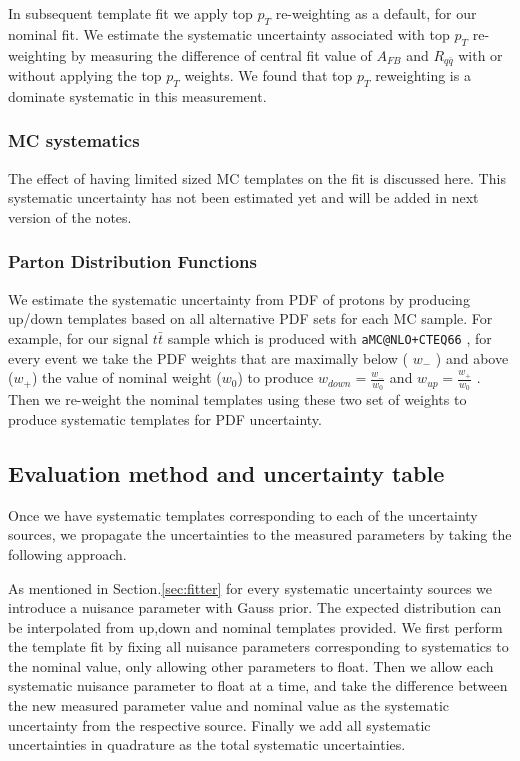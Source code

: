 \documentclass{cmspaperpdf}
\begin{document}
In subsequent template fit we apply top $p_T$ re-weighting as a default, for our nominal fit. We estimate the systematic uncertainty associated with top $p_T$ re-weighting by measuring the difference of central fit value of $A_{FB}$ and $R_{q\bar{q}}$ with or without applying the top $p_T$ weights. We found that top $p_T$ reweighting is a dominate systematic in this measurement. 

\subsubsection{MC systematics}

The effect of having limited sized MC templates on the fit is discussed here. This systematic uncertainty has not been estimated yet and will be added in next version of the notes.

\subsubsection{Parton Distribution Functions}

We estimate the systematic uncertainty from PDF of protons by producing up/down templates based on all alternative PDF sets for each MC sample. For example, for our signal $t\bar{t}$ sample which is produced with \texttt{aMC@NLO+CTEQ66} , for every event we take the PDF weights that are maximally below ( $w_-$ ) and above ($w_+$) the value of nominal weight ($w_0$) to produce $w_{down}=\frac{w_-}{w_0}$ and $w_{up}=\frac{w_+}{w_0}$ . Then we re-weight the nominal templates using these two set of weights to produce systematic templates for PDF uncertainty. 

\subsection{Evaluation method and uncertainty table}

Once we have systematic templates corresponding to each of the uncertainty sources, we propagate the uncertainties to the measured parameters by taking the following approach. 

As mentioned in Section.\ref{sec:fitter} for every systematic uncertainty sources we introduce a nuisance parameter with Gauss prior. The expected distribution can be interpolated from up,down and nominal templates provided. We first perform the template fit by fixing all nuisance parameters corresponding to systematics to the nominal value, only allowing other parameters to float. Then we allow each systematic nuisance parameter to float at a time, and take the difference between the new measured parameter value and nominal value as the systematic uncertainty from the respective source. Finally we add all systematic uncertainties in quadrature  as the total systematic uncertainties. 
\end{document}

